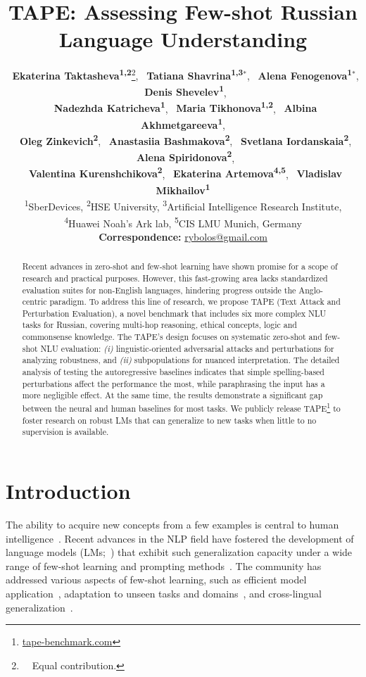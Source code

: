 \documentclass[11pt]{article}
\title{TAPE: Assessing Few-shot Russian Language Understanding}
\author{
    ~\textbf{Ekaterina Taktasheva\textsuperscript{1,2}}\thanks{\ \ Equal contribution.},
    ~\textbf{Tatiana Shavrina\textsuperscript{1,3}$^*$},
    ~\textbf{Alena Fenogenova\textsuperscript{1}$^*$}, 
    ~\textbf{Denis Shevelev\textsuperscript{1}}, \\
    ~\textbf{Nadezhda Katricheva\textsuperscript{1}},
    ~\textbf{Maria Tikhonova\textsuperscript{1,2}}, 
    ~\textbf{Albina Akhmetgareeva\textsuperscript{1}}, \\
    ~\textbf{Oleg Zinkevich\textsuperscript{2}},
    ~\textbf{Anastasiia Bashmakova\textsuperscript{2}}, 
    ~\textbf{Svetlana Iordanskaia\textsuperscript{2}}, 
     ~\textbf{Alena Spiridonova\textsuperscript{2}}, \\
    ~\textbf{Valentina Kurenshchikova\textsuperscript{2}}, 
    ~\textbf{Ekaterina Artemova\textsuperscript{4,5}},
    ~\textbf{Vladislav Mikhailov\textsuperscript{1}} \\ 
    \textsuperscript{1}SberDevices, 
    \textsuperscript{2}HSE University,
    \textsuperscript{3}Artificial Intelligence Research Institute, \\
    \textsuperscript{4}Huawei Noah’s Ark lab,
    \textsuperscript{5}CIS LMU Munich, Germany \\
    \small{
    \textbf{Correspondence:} \href{mailto:rybolos@gmail.com}{rybolos@gmail.com}}
}
\begin{document}
\maketitle

\begin{abstract}
Recent advances in zero-shot and few-shot learning have shown promise for a scope of research and practical purposes. However, this fast-growing area lacks standardized evaluation suites for non-English languages, hindering progress outside the Anglo-centric paradigm. To address this line of research, we propose TAPE (Text Attack and Perturbation Evaluation), a novel benchmark that includes six more complex NLU tasks for Russian, covering multi-hop reasoning, ethical concepts, logic and commonsense knowledge. The TAPE's design focuses on systematic zero-shot and few-shot NLU evaluation: \emph{(i)} linguistic-oriented adversarial attacks and perturbations for analyzing robustness, and \emph{(ii)} subpopulations for nuanced interpretation. The detailed analysis of testing the autoregressive baselines indicates that simple spelling-based perturbations affect the performance the most, while paraphrasing the input has a more negligible effect. At the same time, the results demonstrate a significant gap between the neural and human baselines for most tasks. We publicly release TAPE\footnote{\href{https://tape-benchmark.com/}{tape-benchmark.com}} to foster research on robust LMs that can generalize to new tasks when little to no supervision is available. \end{abstract}



\section{Introduction}
The ability to acquire new concepts from a few examples is central to human intelligence~\cite{tenenbaum2011grow}. Recent advances in the NLP field have fostered the development of language models (LMs;~\citealp{radford2019language,NEURIPS2020_1457c0d6}) that exhibit such generalization capacity under a wide range of few-shot learning and prompting methods~\cite{liu2021pre,beltagy-etal-2022-zero}. The community has addressed various aspects of few-shot learning, such as efficient model application~\cite{schick-schutze-2021-just}, adaptation to
unseen tasks and domains~\cite{bansal-etal-2020-learning,bansal-etal-2020-self}, and cross-lingual generalization~\cite{winata-etal-2021-language,DBLP:journals/corr/abs-2112-10668}.
\end{document}
